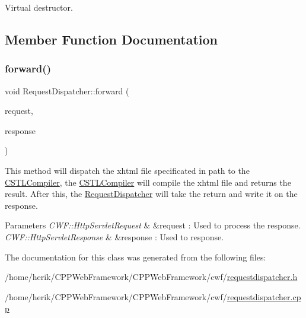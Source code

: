 Virtual destructor. 



\subsection{Member Function Documentation}
\mbox{\label{class_request_dispatcher_aa3ccc7d3debc6555da0f6e437cfb036e}} 
\subsubsection{\texorpdfstring{forward()}{forward()}}
{\footnotesize\ttfamily void Request\+Dispatcher\+::forward (\begin{DoxyParamCaption}\item[{C\+W\+F\+::\+Http\+Servlet\+Request \&}]{request,  }\item[{C\+W\+F\+::\+Http\+Servlet\+Response \&}]{response }\end{DoxyParamCaption})}



This method will dispatch the xhtml file specificated in path to the \hyperlink{class_c_s_t_l_compiler}{C\+S\+T\+L\+Compiler}, the \hyperlink{class_c_s_t_l_compiler}{C\+S\+T\+L\+Compiler} will compile the xhtml file and returns the result. After this, the \hyperlink{class_request_dispatcher}{Request\+Dispatcher} will take the return and write it on the response. 


\begin{DoxyParams}{Parameters}
{\em C\+W\+F\+::\+Http\+Servlet\+Request} & \&request \+: Used to process the response. \\
\hline
{\em C\+W\+F\+::\+Http\+Servlet\+Response} & \&response \+: Used to response. \\
\hline
\end{DoxyParams}


The documentation for this class was generated from the following files\+:\begin{DoxyCompactItemize}
\item 
/home/herik/\+C\+P\+P\+Web\+Framework/\+C\+P\+P\+Web\+Framework/cwf/\hyperlink{requestdispatcher_8h}{requestdispatcher.\+h}\item 
/home/herik/\+C\+P\+P\+Web\+Framework/\+C\+P\+P\+Web\+Framework/cwf/\hyperlink{requestdispatcher_8cpp}{requestdispatcher.\+cpp}\end{DoxyCompactItemize}
